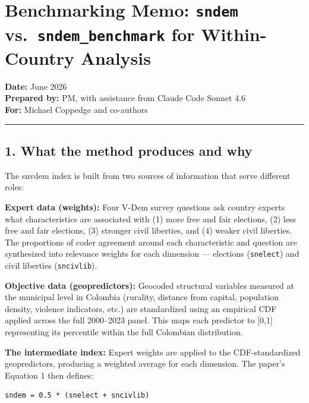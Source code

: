 \documentclass[
]{article}
\author{}
\date{\vspace{-2.5em}}
\begin{document}
\section{\texorpdfstring{Benchmarking Memo: \texttt{sndem}
vs.~\texttt{sndem\_benchmark} for Within-Country
Analysis}{Benchmarking Memo: sndem vs.~sndem\_benchmark for Within-Country Analysis}}\label{benchmarking-memo-sndem-vs.-sndem_benchmark-for-within-country-analysis}

\textbf{Date:} June 2026\\
\textbf{Prepared by:} PM, with assistance from Claude Code Sonnet 4.6\\
\textbf{For:} Michael Coppedge and co-authors

\begin{center}\rule{0.5\linewidth}{0.5pt}\end{center}

\subsection{1. What the method produces and
why}\label{what-the-method-produces-and-why}

The snvdem index is built from two sources of information that serve
different roles:

\textbf{Expert data (weights):} Four V-Dem survey questions ask country
experts what characteristics are associated with (1) more free and fair
elections, (2) less free and fair elections, (3) stronger civil
liberties, and (4) weaker civil liberties. The proportions of coder
agreement around each characteristic and question are synthesized into
relevance weights for each dimension --- elections (\texttt{snelect})
and civil liberties (\texttt{sncivlib}).

\textbf{Objective data (geopredictors):} Geocoded structural variables
measured at the municipal level in Colombia (rurality, distance from
capital, population density, violence indicators, etc.) are standardized
using an empirical CDF applied across the full 2000--2023 panel. This
maps each predictor to {[}0,1{]} representing its percentile within the
full Colombian distribution.

\textbf{The intermediate index:} Expert weights are applied to the
CDF-standardized geopredictors, producing a weighted average for each
dimension. The paper's Equation 1 then defines:

\begin{verbatim}
sndem = 0.5 * (snelect + sncivlib)
\end{verbatim}
\end{document}
